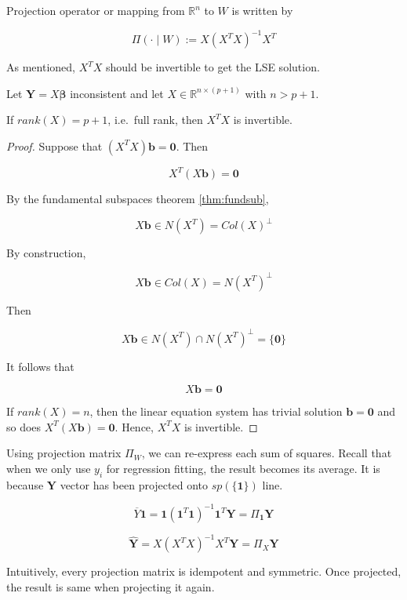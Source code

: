 \documentclass[]{book}
\theoremstyle{definition}
\theoremstyle{definition}
\theoremstyle{definition}
\theoremstyle{remark}
\let\BeginKnitrBlock\begin \let\EndKnitrBlock\end
\begin{document}
\BeginKnitrBlock{definition}[Projection matrix]
\protect\hypertarget{def:projop}{}{\label{def:projop} {} }Projection operator or mapping from \(\mathbb{R}^n\) to \(W\) is written by

\[\Pi(\cdot \mid W) := X(X^TX)^{-1}X^T\]
\EndKnitrBlock{definition}

As mentioned, \(X^TX\) should be invertible to get the LSE solution.

\BeginKnitrBlock{theorem}
\protect\hypertarget{thm:fullrank}{}{\label{thm:fullrank} }Let \(\mathbf{Y} = X\boldsymbol\beta\) inconsistent and let \(X \in \mathbb{R}^{n \times (p + 1)}\) with \(n > p + 1\).

If \(rank(X) = p + 1\), i.e.~full rank, then \(X^T X\) is invertible.
\EndKnitrBlock{theorem}

\BeginKnitrBlock{proof}
{}Suppose that \((X^TX)\mathbf{b} = \mathbf{0}\). Then

\[X^T (X\mathbf{b}) = \mathbf{0}\]

By the fundamental subspaces theorem \ref{thm:fundsub},

\[X\mathbf{b} \in N(X^T) = Col(X)^{\perp}\]

By construction,

\[X\mathbf{b} \in Col(X) = N(X^T)^{\perp}\]

Then

\[X\mathbf{b} \in N(X^T) \cap N(X^T)^{\perp} = \{ \mathbf{0} \}\]

It follows that

\[X\mathbf{b} = \mathbf{0}\]

If \(rank(X) = n\), then the linear equation system has trivial solution \(\mathbf{b} = \mathbf{0}\) and so does \(X^T (X\mathbf{b}) = \mathbf{0}\). Hence, \(X^T X\) is invertible.
\EndKnitrBlock{proof}

Using projection matrix \(\Pi_W\), we can re-express each sum of squares. Recall that when we only use \(y_i\) for regression fitting, the result becomes its average. It is because \(\mathbf{Y}\) vector has been projected onto \(sp(\{ \mathbf{1} \})\) line.

\BeginKnitrBlock{remark}
{}\[\overline{Y}\mathbf{1} = \mathbf{1}(\mathbf{1}^T\mathbf{1})^{-1}\mathbf{1}^T\mathbf{Y} = \Pi_{\mathbf{1}}\mathbf{Y}\]

\[\mathbf{\hat{Y}} = X(X^TX)^{-1}X^T \mathbf{Y} = \Pi_X \mathbf{Y}\]
\EndKnitrBlock{remark}

Intuitively, every projection matrix is idempotent and symmetric. Once projected, the result is same when projecting it again.
\end{document}
